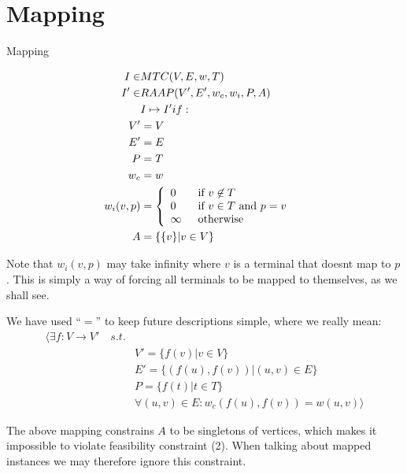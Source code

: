 \section{Mapping}

\begin{definition}
Mapping

\begin{align}
	\nonumber I \in & MTC(V,E,w,T) &\\
	\nonumber I' \in & RAAP(V', E', w_c, w_i, P, A) &\\
	\nonumber & I \mapsto I' if: &\\
	\nonumber V' & = V\\
	\nonumber E' & = E\\
	\nonumber P & = T\\
	\nonumber w_c & = w\\
	\nonumber w_i(v,p) & = \mbox{$\left\{ 
		\begin{array}{l l}
			0 \quad & \mbox{if $v \not\in T$}\\
			0 & \mbox{if $v \in T$ and $p = v$}\\
			\infty & \mbox{otherwise}\\ \end{array} \right.$} \\
	\nonumber A & = \{\{v\} | v \in V\}
\end{align}

Note that $w_i(v, p)$ may take infinity where $v$ is a terminal that doesnt map to $p$.
This is simply a way of forcing all terminals to be mapped to themselves, as we shall see.

We have used ``$=$'' to keep future descriptions simple, where we really mean:
\begin{align}
	\nonumber \langle \exists f : V \rightarrow V' \quad s.t. & \\
	\nonumber & V' = \{f(v) | v \in V\} \\
	\nonumber & E' = \{(f(u), f(v)) | (u,v) \in E\} \\
	\nonumber & P = \{f(t) | t \in T\} \\
	\nonumber & \forall (u, v) \in E : w_c(f(u), f(v)) = w(u, v) \rangle
\end{align}

The above mapping constrains $A$ to be singletons of vertices, which makes it impossible to violate feasibility constraint (2).
When talking about mapped instances we may therefore ignore this constraint.
\end{definition}

